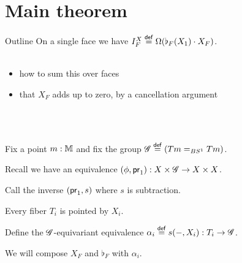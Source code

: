 \section{Main theorem}

\begin{frame}{Outline}
On a single face we have \( I^X_F\stackrel{\mathsf{def}}{=}\Omega(\flat_F(X_1)\cdot X_F)\).\\~\\

\begin{itemize}
\item<3-> how to sum this over faces
\item<4-> that \( X_F \) adds up to zero, by a cancellation argument
\end{itemize}
\\~\\

\end{frame}

% 

\begin{frame}
Fix a point \( m:\mathbb{M} \) and fix the group \( \mathscr{G}\stackrel{\mathsf{def}}{=} (Tm=_{BS^1}Tm)\).

Recall we have an equivalence \( (\phi, \mathsf{pr}_1):X\times \mathscr{G}\to X\times X \).

Call the inverse \( (\mathsf{pr}_1, s) \) where \( s \) is \alert{subtraction}.

Every fiber \( T_i \) is pointed by \( X_i \).

Define the \( \mathscr{G} \)-equivariant equivalence \( \alpha_i\stackrel{\mathsf{def}}{=} s(-,X_i):T_i\to \mathscr{G} \).

We will compose \( X_F \) and \( \flat_F \) with \( \alpha_i \).
\end{frame}

